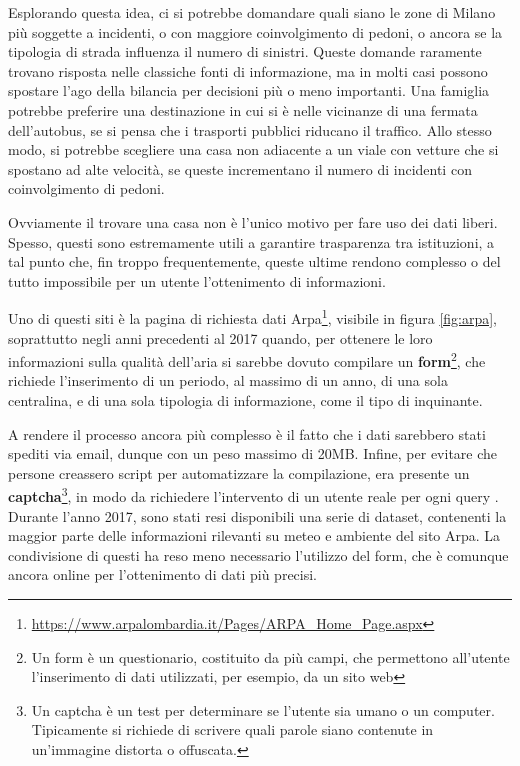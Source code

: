 \documentclass[a4paper,12pt]{report}
\newcommand{\skipline}{\vspace{0.2in}}
\begin{document}
Esplorando questa idea, ci si potrebbe domandare quali siano le zone 
di Milano più soggette a incidenti, o con maggiore coinvolgimento di pedoni, 
o ancora se la tipologia di strada influenza il numero di sinistri. 
Queste domande raramente trovano risposta nelle classiche fonti di informazione, 
ma in molti casi possono spostare l'ago della bilancia per decisioni più o meno 
importanti.
Una famiglia potrebbe preferire una destinazione in cui si è nelle 
vicinanze di una fermata dell'autobus, se si pensa che i trasporti pubblici riducano 
il traffico. 
Allo stesso modo, si potrebbe scegliere una casa non adiacente 
a un viale con vetture che si spostano ad alte velocità, se queste incrementano 
il numero di incidenti con coinvolgimento di pedoni.

\skipline
Ovviamente il trovare una casa non è l'unico motivo per fare uso dei dati liberi. 
Spesso, questi sono estremamente utili a garantire trasparenza tra istituzioni, 
a tal punto che, fin troppo frequentemente, queste ultime rendono complesso o 
del tutto impossibile per un utente l'ottenimento di informazioni.

Uno di questi siti è la pagina di richiesta dati 
Arpa\footnote{\url{https://www.arpalombardia.it/Pages/ARPA_Home_Page.aspx}}, 
visibile in figura \ref{fig:arpa},
soprattutto negli anni precedenti al 2017 quando, per ottenere le loro informazioni 
sulla qualità dell'aria si sarebbe dovuto compilare un 
\textbf{form}\footnote{Un form è un questionario, costituito da più campi, che 
permettono all'utente l'inserimento di dati utilizzati, per esempio, da un sito web}, 
che richiede l'inserimento di un periodo, al massimo di un anno, di una sola 
centralina, e di una sola tipologia di informazione, come il tipo di inquinante. 

A rendere il processo ancora più complesso è il fatto che i dati sarebbero stati 
spediti via email, dunque con un peso massimo di 20MB.
Infine, per evitare che persone creassero script per automatizzare la compilazione, 
era presente un \textbf{captcha}\footnote{Un captcha è un test per determinare se l'utente 
sia umano o un computer. Tipicamente si richiede di scrivere quali parole siano 
contenute in un'immagine distorta o offuscata.}, in modo da richiedere l'intervento 
di un utente reale per ogni query \cite{TRENTINI:1}.
Durante l'anno 2017, sono stati resi disponibili una serie di dataset, contenenti la maggior 
parte delle informazioni rilevanti su meteo e ambiente del sito Arpa. 
La condivisione di questi ha reso meno necessario l'utilizzo del form, che 
è comunque ancora online per l'ottenimento di dati più precisi.
\end{document}
